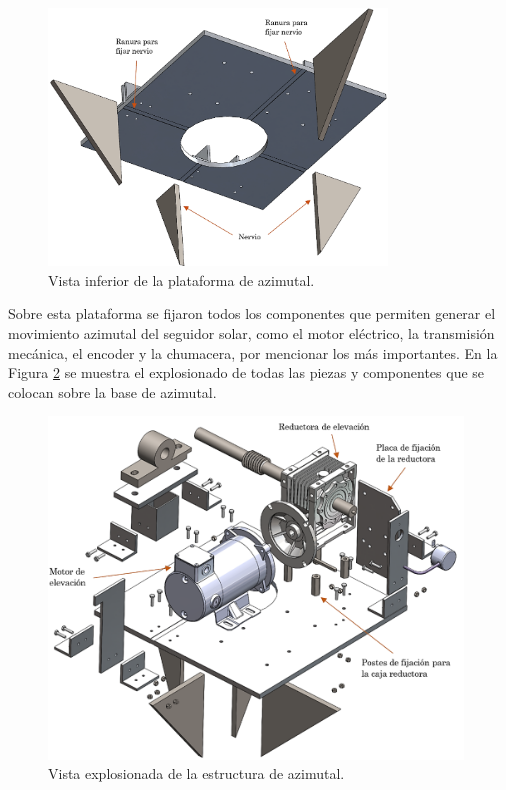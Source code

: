 \begin{figure}[H]
	\centering
	\includegraphics[width=9cm]{imagenes/azi2}
	\caption{Vista inferior de la plataforma de azimutal.}
	\label{fig:azi2}
\end{figure}

Sobre esta plataforma se fijaron todos los componentes que permiten generar el movimiento azimutal del seguidor solar, como el motor eléctrico, la transmisión mecánica, el encoder y la chumacera, por mencionar los más importantes. En la Figura \ref{fig:azi3} se muestra el explosionado de todas las piezas y componentes que se colocan sobre la base de azimutal.

\begin{figure}[H]
	\centering
	\includegraphics[width=11cm]{imagenes/azi3}
	\caption{Vista explosionada de la estructura de azimutal.}
	\label{fig:azi3}
\end{figure}

